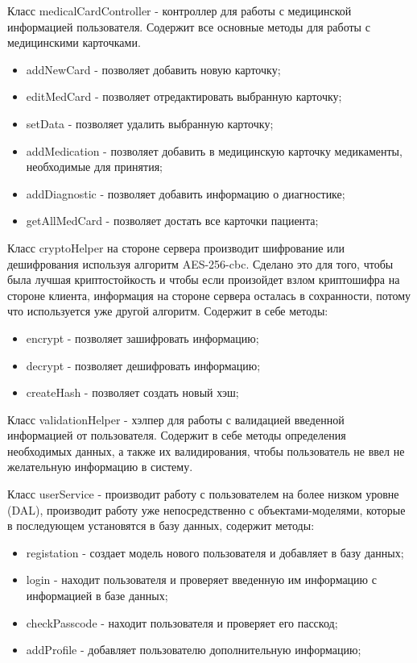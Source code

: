 Класс medicalCardController - контроллер для работы с медицинской информацией пользователя. Содержит все основные методы для работы с медицинскими карточками.

\begin{itemize}
  \item addNewCard - позволяет добавить новую карточку;
  \item editMedCard - позволяет отредактировать выбранную карточку;
  \item setData - позволяет удалить выбранную карточку;
  \item addMedication - позволяет добавить в медицинскую карточку медикаменты, необходимые для принятия;
  \item addDiagnostic - позволяет добавить информацию о диагностике;
  \item getAllMedCard - позволяет достать все карточки пациента;
\end{itemize}

Класс cryptoHelper на стороне сервера производит шифрование или дешифрования используя алгоритм AES-256-cbc. Сделано это для того, чтобы была лучшая криптостойкость и чтобы если произойдет взлом криптошифра на стороне клиента, информация на стороне сервера осталась в сохранности, потому что используется уже другой алгоритм. Содержит в себе методы:
\begin{itemize}
  \item encrypt - позволяет зашифровать информацию;
  \item decrypt - позволяет дешифровать информацию;
  \item createHash - позволяет создать новый хэш;
\end{itemize}

Класс validationHelper - хэлпер для работы с валидацией введенной информацией от пользователя. Содержит в себе методы определения необходимых данных, а также их валидирования, чтобы пользователь не ввел не желательную информацию в систему.

Класс userService - производит работу с пользователем на более низком уровне (DAL), производит работу уже непосредственно с объектами-моделями, которые в последующем установятся в базу данных, содержит методы:
\begin{itemize}
  \item registation - создает модель нового пользователя и добавляет в базу данных;
  \item login - находит пользователя и проверяет введенную им информацию с информацией в базе данных;
  \item checkPasscode - находит пользователя и проверяет его пасскод;
  \item addProfile - добавляет пользователю дополнительную информацию;
\end{itemize}

